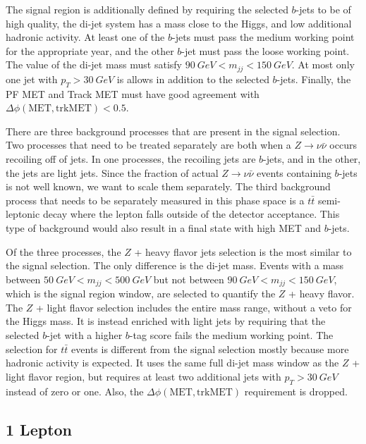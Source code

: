 The signal region is additionally defined by requiring
the selected $b$-jets to be of high quality,
the di-jet system has a mass close to the Higgs,
and low additional hadronic activity.
At least one of the $b$-jets must pass the medium working point for the appropriate year,
and the other $b$-jet must pass the loose working point.
The value of the di-jet mass must satisfy $\SI{90}{GeV} < m_{jj} < \SI{150}{GeV}$.
At most only one jet with $p_T > \SI{30}{GeV}$ is allows in addition to the selected $b$-jets.
Finally, the PF MET and Track MET must have good agreement with
$\Delta \phi(\mathrm{MET}, \mathrm{trkMET}) < 0.5$.

There are three background processes that are present in the signal selection.
Two processes that need to be treated separately are both when a $Z \rightarrow \nu\bar{\nu}$
occurs recoiling off of jets.
In one processes, the recoiling jets are $b$-jets,
and in the other, the jets are light jets.
Since the fraction of actual $Z \rightarrow \nu\bar{\nu}$ events
containing $b$-jets is not well known, we want to scale them separately.
The third background process that needs to be separately measured in this phase space
is a $t\bar{t}$ semi-leptonic decay where the lepton falls outside of the detector acceptance.
This type of background would also result in a final state with high MET and $b$-jets.

Of the three processes,
the $Z$ + heavy flavor jets selection is the most similar to the signal selection.
The only difference is the di-jet mass.
Events with a mass between $\SI{50}{GeV} < m_{jj} < \SI{500}{GeV}$ but not between
$\SI{90}{GeV} < m_{jj} < \SI{150}{GeV}$, which is the signal region window,
are selected to quantify the $Z$ + heavy flavor.
The $Z$ + light flavor selection includes the entire mass range,
without a veto for the Higgs mass.
It is instead enriched with light jets by requiring that the selected $b$-jet with
a higher $b$-tag score fails the medium working point.
The selection for $t\bar{t}$ events is different from the signal selection
mostly because more hadronic activity is expected.
It uses the same full di-jet mass window as the $Z$ + light flavor region,
but requires at least two additional jets with $p_T > \SI{30}{GeV}$ instead of zero or one.
Also, the $\Delta \phi(\mathrm{MET}, \mathrm{trkMET})$ requirement is dropped.

\subsection{1 Lepton}

